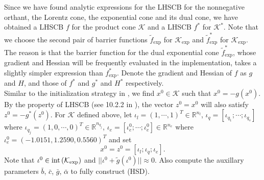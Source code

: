 \documentclass[11pt]{article}
\theoremstyle{definition}
\theoremstyle{plain}
\def\interior{\protect{\textnormal{int}}}
\begin{document}
Since we have found analytic expressions for the LHSCB for the nonnegative orthant, the Lorentz cone, the exponential cone and its dual cone, we have obtained a LHSCB $f$ for the product cone $\mathcal{K}$ and a LHSCB $f^*$ for $\mathcal{K}^*$. Note that we choose the second pair of barrier functions $\tilde{f}_{\exp}$ for $\mathcal{K}_{\exp}$ and $\tilde{f}^*_{\exp}$ for $\mathcal{K}_{\exp}$. The reason is that the barrier function for the dual exponential cone $\tilde{f}_{\exp}^*$, whose gradient and Hessian will be frequently evaluated in the implementation, takes a slightly simpler expression than $f_{\exp}^*$.
Denote the gradient and Hessian of $f$ as $g$ and $H$, and those of $f^*$ and $g^*$ and $H^*$ respectively. \\

Similar to the initialization strategy in \cite{Akle_thesis}, we find $x^0 \in \mathcal{K}$ such that $x^0 = -g(x^0)$. By the property of LHSCB (see 10.2.2 in \cite{Robert_thesis}), the vector $z^0=x^0$ will also satisfy $z^0 = -g^*(z^0)$. For $\mathcal{K}$ defined above, let $\iota_l = (1,\cdots,1)^T \in \mathbb{R}^{n_l}$, $\iota_q = [\iota_{q_1}; \cdots; \iota_{q_s}]$ where $\iota_{q_j} = (1,0,\cdots, 0)^T \in \mathbb{R}^{n_{q_j}}$, $\iota_e = [\iota^0_e; \cdots; \iota^0_e]\in \mathbb{R}^{n_e}$ where $\iota_e^0 = (-1.0151, 1.2590, 0.5560)^T$ and set
\[x^0 = z^0 = [\iota_l; \iota_q; \iota_e].\]
Note that $\iota^0 \in \interior \left(\mathcal{K}_{\exp}\right)$ and $||\iota^0 + \tilde{g}(\iota^0)|| \approx 0$. Also compute the auxillary parameters $\bar{b}$, $\bar{c}$, $\bar{g}$, $\bar{\alpha}$ to fully construct (HSD).
\end{document}
